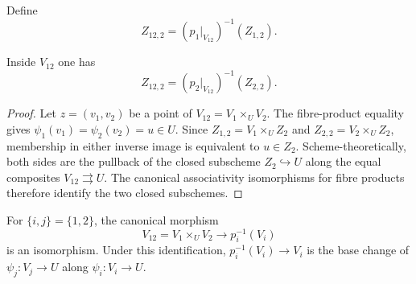 \begin{definition}
  \label{def:nagata-two-open-comparison-boundary}

  Define
  \[
    Z_{12,2}=(p_1|_{V_{12}})^{-1}(Z_{1,2}).
  \]
\end{definition}

\begin{lemma}
  \label{lemma:nagata-two-open-comparison-boundary}

  Inside $V_{12}$ one has
  \[
    Z_{12,2}=(p_2|_{V_{12}})^{-1}(Z_{2,2}).
  \]
\end{lemma}

\begin{proof}
  Let $z=(v_1,v_2)$ be a point of $V_{12}=V_1\times_UV_2$.  The fibre-product
  equality gives $\psi_1(v_1)=\psi_2(v_2)=u\in U$.  Since
  $Z_{1,2}=V_1\times_UZ_2$ and $Z_{2,2}=V_2\times_UZ_2$, membership in either
  inverse image is equivalent to $u\in Z_2$.  Scheme-theoretically, both
  sides are the pullback of the closed subscheme $Z_2\hookrightarrow U$ along
  the equal composites $V_{12}\rightrightarrows U$.  The canonical
  associativity isomorphisms for fibre products therefore identify the two
  closed subschemes.
\end{proof}


\begin{lemma}
  \label{lemma:nagata-comparison-restrict-proper-open}

  For \(\{i,j\}=\{1,2\}\), the canonical morphism
  \[
    V_{12}=V_1\times_UV_2\longrightarrow p_i^{-1}(V_i)
  \]
  is an isomorphism.  Under this identification,
  \(p_i^{-1}(V_i)\to V_i\) is the base change of
  \(\psi_j\colon V_j\to U\) along \(\psi_i\colon V_i\to U\).
\end{lemma}

